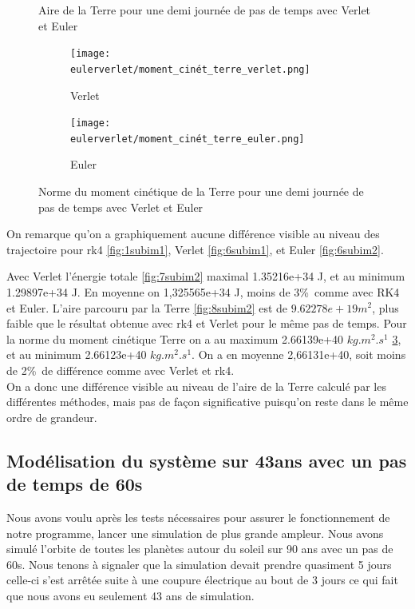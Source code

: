 \documentclass[11pt]{article}
\begin{document}
\begin{figure}[H]
\caption{Aire de la Terre pour une demi journée de pas de temps avec Verlet et Euler}
\label{fig:image2}
\end{figure}

\begin{figure}[H]
\begin{subfigure}{0.5\textwidth}
\texttt{[image: eulerverlet/moment\_cinét\_terre\_verlet.png]}
\caption{Verlet}
\label{fig:9subim1}
\end{subfigure}
\begin{subfigure}{0.5\textwidth}
\texttt{[image: eulerverlet/moment\_cinét\_terre\_euler.png]}
\caption{Euler}
\label{fig:9subim2}
\end{subfigure}

\caption{Norme du moment cinétique de la Terre pour une demi journée de pas de temps avec Verlet et Euler}
\label{fig:image2}
\end{figure}

On remarque qu'on a graphiquement aucune différence visible au niveau des trajectoire pour rk4 \ref{fig:1subim1}, Verlet \ref{fig:6subim1}, et Euler \ref{fig:6subim2}.



Avec Verlet l'énergie totale \ref{fig:7subim2} maximal 1.35216e+34 J, et au minimum 1.29897e+34 J. En moyenne on 1,325565e+34 J, moins de 3\%\ comme avec RK4 et Euler. 
L'aire parcouru par la Terre \ref{fig:8subim2} est de \(9.62278e+19 m^2\), plus faible que le résultat obtenue avec rk4 et Verlet pour le même pas de temps. Pour la norme du moment cinétique Terre on a au maximum 2.66139e+40 \(kg.m^2.s^1\) \ref{fig:9subim2}, et au minimum 2.66123e+40 \(kg.m^2.s^1\). On a en moyenne 2,66131e+40, soit moins de 2\%\ de différence comme avec Verlet et rk4.
\\[2 mm]
On a donc une différence visible au niveau de l'aire de la Terre calculé par les différentes méthodes, mais pas de façon significative puisqu'on reste dans le même ordre de grandeur.

\subsection{Modélisation du système sur 43ans avec un pas de temps de 60s}

Nous avons voulu après les tests nécessaires pour assurer le fonctionnement de notre programme, lancer une simulation de plus grande ampleur. Nous avons simulé l'orbite de toutes les planètes autour du soleil sur 90 ans avec un pas de 60s. Nous tenons à signaler que la simulation devait prendre quasiment 5 jours celle-ci s'est arrêtée suite à une coupure électrique au bout de 3 jours ce qui fait que nous avons eu seulement 43 ans de simulation.
\end{document}
